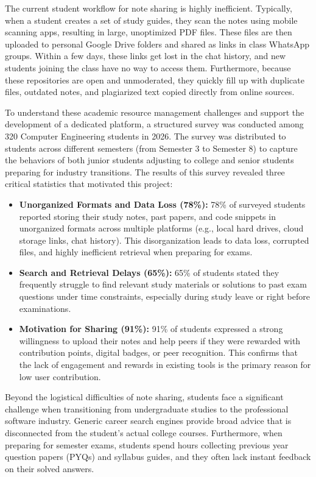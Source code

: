 \documentclass[12,Times new Roman,a4paper]{report}
\begin{document}
The current student workflow for note sharing is highly inefficient. Typically, when a student creates a set of study guides, they scan the notes using mobile scanning apps, resulting in large, unoptimized PDF files. These files are then uploaded to personal Google Drive folders and shared as links in class WhatsApp groups. Within a few days, these links get lost in the chat history, and new students joining the class have no way to access them. Furthermore, because these repositories are open and unmoderated, they quickly fill up with duplicate files, outdated notes, and plagiarized text copied directly from online sources.

To understand these academic resource management challenges and support the development of a dedicated platform, a structured survey was conducted among 320 Computer Engineering students in 2026. The survey was distributed to students across different semesters (from Semester 3 to Semester 8) to capture the behaviors of both junior students adjusting to college and senior students preparing for industry transitions. The results of this survey revealed three critical statistics that motivated this project:
\begin{itemize}
    \item \textbf{Unorganized Formats and Data Loss (78\%):} 78\% of surveyed students reported storing their study notes, past papers, and code snippets in unorganized formats across multiple platforms (e.g., local hard drives, cloud storage links, chat history). This disorganization leads to data loss, corrupted files, and highly inefficient retrieval when preparing for exams.
    \item \textbf{Search and Retrieval Delays (65\%):} 65\% of students stated they frequently struggle to find relevant study materials or solutions to past exam questions under time constraints, especially during study leave or right before examinations.
    \item \textbf{Motivation for Sharing (91\%):} 91\% of students expressed a strong willingness to upload their notes and help peers if they were rewarded with contribution points, digital badges, or peer recognition. This confirms that the lack of engagement and rewards in existing tools is the primary reason for low user contribution.
\end{itemize}

Beyond the logistical difficulties of note sharing, students face a significant challenge when transitioning from undergraduate studies to the professional software industry. Generic career search engines provide broad advice that is disconnected from the student's actual college courses. Furthermore, when preparing for semester exams, students spend hours collecting previous year question papers (PYQs) and syllabus guides, and they often lack instant feedback on their solved answers.
\end{document}
